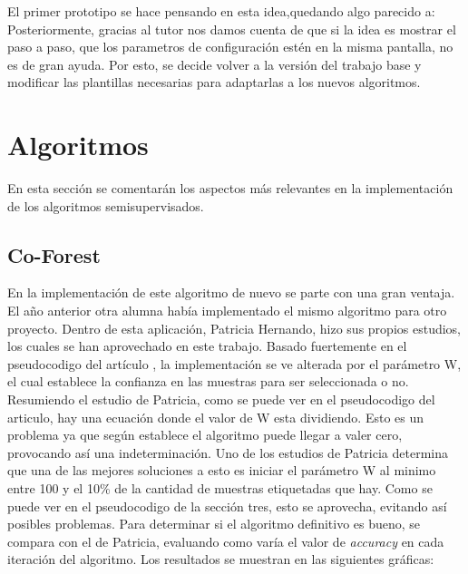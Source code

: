 El primer prototipo se hace pensando en esta idea,quedando algo parecido a:
Posteriormente, gracias al tutor nos damos cuenta de que si la idea es mostrar el paso a paso, que los parametros de configuración estén en la misma pantalla, no es de gran ayuda. Por esto, se decide volver a la versión del trabajo base y modificar las plantillas necesarias para adaptarlas a los nuevos algoritmos.

\section{Algoritmos}
En esta sección se comentarán los aspectos más relevantes en la implementación de los algoritmos semisupervisados.
\subsection{Co-Forest}
En la implementación de este algoritmo de nuevo se parte con una gran ventaja. El año anterior otra alumna había implementado el mismo algoritmo para otro proyecto. Dentro de esta aplicación, Patricia Hernando, hizo sus propios estudios, los cuales se han aprovechado en este trabajo.
Basado fuertemente en el pseudocodigo del artículo \cite{IEEE:CoForest}, la implementación se ve alterada por el parámetro W, el cual establece la confianza en las muestras para ser seleccionada o no. Resumiendo el estudio de Patricia, como se puede ver en el pseudocodigo del articulo, hay una ecuación donde el valor de W esta dividiendo. Esto es un problema ya que según establece el algoritmo puede llegar a valer cero, provocando así una indeterminación. Uno de los estudios de Patricia determina que una de las mejores soluciones a esto es iniciar el parámetro W al minimo entre 100 y el 10\% de la cantidad de muestras etiquetadas que hay. Como se puede ver en el pseudocodigo de la sección tres, esto se aprovecha, evitando así posibles problemas.
Para determinar si el algoritmo definitivo es bueno, se compara con el de Patricia, evaluando como varía el valor de \textit{accuracy} en cada iteración del algoritmo. Los resultados se muestran en las siguientes gráficas:
